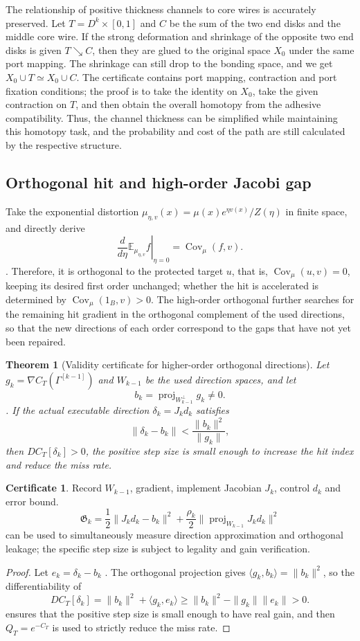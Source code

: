 \documentclass[11pt,a4paper]{article}
\theoremstyle{plain}
\newtheorem{theorem}{Theorem}[section]
\theoremstyle{definition}
\newtheorem*{certificate}{Certificate}
\theoremstyle{remark}
\begin{document}
\begin{CJK*}
The relationship of positive thickness channels to core wires is accurately preserved. Let $T=D^k\times[0,1]$ and $C$ be the sum of the two end disks and the middle core wire. If the strong deformation and shrinkage of the opposite two end disks is given $T\searrow C$, then they are glued to the original space $X_0$ under the same port mapping. The shrinkage can still drop to the bonding space, and we get $X_0\cup T\simeq X_0\cup C$. The certificate contains port mapping, contraction and port fixation conditions; the proof is to take the identity on $X_0$, take the given contraction on $T$, and then obtain the overall homotopy from the adhesive compatibility. Thus, the channel thickness can be simplified while maintaining this homotopy task, and the probability and cost of the path are still calculated by the respective structure.

\subsection { Orthogonal hit and high-order Jacobi gap }

Take the exponential distortion $\mu_{\eta,v}(x)=\mu(x)e^{\eta v(x)}/Z(\eta)$ in finite space, and directly derive \[
 \left.\frac{d}{d\eta}\mathbb E_{\mu_{\eta,v}}f\right|_{\eta=0}
 =\operatorname{Cov}_\mu(f,v).
\]. Therefore, it is orthogonal to the protected target $u$, that is, $\operatorname{Cov}_\mu(u,v)=0$, keeping its desired first order unchanged; whether the hit is accelerated is determined by $\operatorname{Cov}_\mu(1_B,v)>0$. The high-order orthogonal further searches for the remaining hit gradient in the orthogonal complement of the used directions, so that the new directions of each order correspond to the gaps that have not yet been repaired.

\begin{theorem}
[Validity certificate for higher-order orthogonal directions]\label{ss:orthogonal}
Let $g_k=\nabla C_T(\Gamma^{[k-1]})$ and $W_{k-1}$ be the used direction spaces, and let \[
 b_k=\operatorname{proj}_{W_{k-1}^{\perp}}g_k\ne0.
\]. If the actual executable direction $\delta_k=J_kd_k$ satisfies \[
 \|\delta_k-b_k\|<\frac{\|b_k\|^2}{\|g_k\|},
\] then $DC_T[\delta_k]>0$, the positive step size is small enough to increase the hit index and reduce the miss rate.\end{theorem}
\begin{certificate}
Record $W_{k-1}$, gradient, implement Jacobian $J_k$, control $d_k$ and error bound. \[
 \mathfrak G_k=\frac12\|J_kd_k-b_k\|^2
 +\frac{\rho_k}{2}\|\operatorname{proj}_{W_{k-1}}J_kd_k\|^2
\] can be used to simultaneously measure direction approximation and orthogonal leakage; the specific step size is subject to legality and gain verification.\end{certificate}
\begin{proof}
Let $e_k=\delta_k-b_k$ . The orthogonal projection gives $\langle g_k,b_k\rangle=\|b_k\|^2$, so the differentiability of \[
 DC_T[\delta_k]
 =\|b_k\|^2+\langle g_k,e_k\rangle
 \ge\|b_k\|^2-\|g_k\|\|e_k\|>0.
\] ensures that the positive step size is small enough to have real gain, and then $Q_T=e^{-C_T}$ is used to strictly reduce the miss rate.\end{proof}



\end{CJK*}
\end{document}
